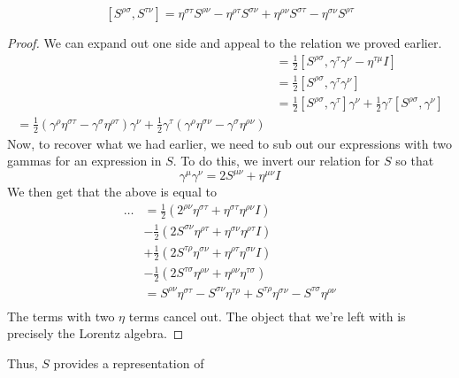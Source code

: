 \begin{claim}
	\[
		[ S ^{ \rho\sigma } , S ^{ \tau \nu } ] = 
		\eta ^{ \sigma \tau } S ^{ \rho \nu }  - 
		\eta ^{ \rho \tau } S ^{ \sigma \nu } 
		+ \eta ^{ \rho \nu } S ^{ \sigma \tau } 
		 - \eta ^{ \sigma \nu } S ^{ \rho \tau }
	\]

\begin{proof}
We can expand out one side and appeal to the relation 
we proved earlier. 
\begin{align*}
	[ S ^{ \rho \sigma }, S^{ \tau \nu } ] &=  
	\frac{1}{2 } [ S ^{ \rho \sigma } ,  \gamma ^ \tau 
	\gamma ^ \nu - \eta ^{ \tau \mu } I ] \\
	&=  \frac{1}{2 } [ S^{ \rho \sigma } , \gamma ^{ \tau } 
	\gamma ^{ \nu } ] \\
	&=  \frac{1}{2 } [ S ^{ \rho \sigma } , \gamma ^ \tau ] 
	\gamma ^{ \nu } + \frac{1}{2 } \gamma ^ \tau [ 
	S ^{ \rho \sigma } , \gamma ^ \nu ] \\
	= \frac{1}{2 } ( \gamma ^ \rho \eta ^{ \sigma \tau}  - \gamma ^ \sigma 
	\eta ^{ \rho \tau } ) \gamma ^ \nu + \frac{1}{2 } \gamma ^ \tau 
	( \gamma ^ \rho \eta ^{ \sigma \nu }  - \gamma ^ \sigma \eta ^{ \rho \nu 
	} ) 
\end{align*}
Now, to recover what we had earlier, we need to sub out our expressions 
with two gammas for an expression in $S$. To do this, 
we invert our relation for $ S $ so that 
\[
 \gamma ^ \mu \gamma ^ \nu  = 2 S ^{ \mu \nu } + \eta ^{ \mu \nu } I 
\] We then 
get that the above is equal to 
\begin{align*}
	\dots & = \frac{1}{2 } \left(  2 ^{ \rho \nu } \eta ^{ \sigma \tau }
	 + \eta ^{ \sigma \tau } \eta ^{ \rho \nu } I \right) \\ 
	      &  - \frac{1}{2 } \left(  
	      2 S^{ \sigma \nu } \eta ^{ \rho \tau } + \eta ^{ \sigma \nu } 
      \eta ^{ \rho \tau } I  \right) \\
	      & + \frac{1}{2 } \left(  2 S^{ \tau \rho } \eta ^{ \sigma \nu }
	      + \eta ^{ \rho \tau } \eta ^{ \sigma \nu } I \right) \\
	      & - \frac{1}{2 } \left(  2 S ^{ \tau\sigma }
	      \eta ^{ \rho \nu } + \eta ^{ \rho \nu } \eta ^{ \tau \sigma }\right)
	      \\
	      &=  S ^{ \rho \nu } \eta ^{ \sigma \tau } 
	       - S^{ \sigma \nu } \eta ^{ \tau \rho } + 
	       S ^{ \tau \rho } \eta ^{ \sigma \nu } 
	        - S ^{ \tau \sigma } \eta ^{ \rho \nu }\\
\end{align*}
The terms with two $ \eta $ terms cancel out. 
The object that we're left with is precisely the Lorentz algebra. 

\end{proof}
\end{claim} Thus, $ S $ provides a representation of 
